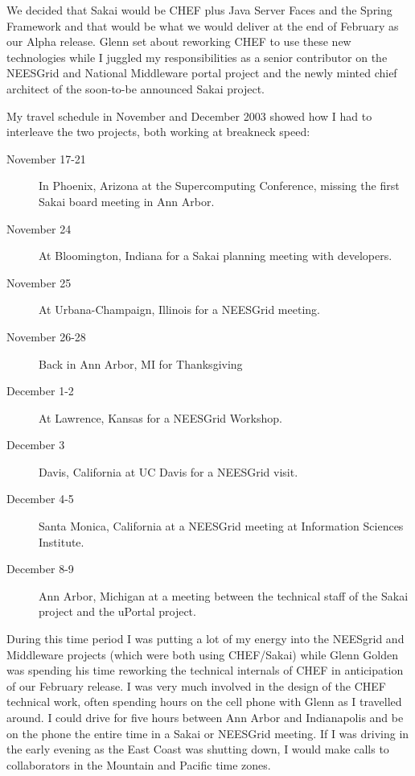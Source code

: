 \documentclass[12pt]{book}
\begin{document}
We decided that Sakai would be CHEF plus Java Server Faces and the Spring Framework
and that would be what we would deliver at the end of February as our Alpha release.
Glenn set about reworking CHEF to use these new technologies while I juggled
my responsibilities as a senior contributor on the NEESGrid and National
Middleware portal project and the newly minted chief architect of the
soon-to-be announced Sakai project.

My travel schedule in November and December 2003 showed how I had to interleave
the two projects, both working at breakneck speed:

\begin{description}

\item[November 17-21] In Phoenix, Arizona at the Supercomputing Conference,
missing the first Sakai board meeting in Ann Arbor.

\item[November 24] At Bloomington, Indiana for a Sakai planning meeting with
developers.

\item[November 25] At Urbana-Champaign, Illinois for a NEESGrid meeting.

\item[November 26-28] Back in Ann Arbor, MI for Thanksgiving

\item[December 1-2] At Lawrence, Kansas for a NEESGrid Workshop.

\item[December 3] Davis, California at UC Davis for a NEESGrid
visit.

\item[December 4-5] Santa Monica, California at a NEESGrid meeting at Information
Sciences Institute.

\item[December 8-9] Ann Arbor, Michigan at a meeting between the technical staff
of the Sakai project and the uPortal project.

\end{description}

During this time period I was putting a lot of my energy into the NEESgrid and Middleware
projects (which were both using CHEF\slash Sakai) while Glenn Golden was spending his time
reworking the technical internals of CHEF in anticipation of our February release.
I was very much involved in the design of the CHEF technical work,
often spending hours on the cell phone with Glenn as I travelled around.
I could drive for five hours between Ann Arbor and Indianapolis and be on the phone
the entire time in a Sakai or NEESGrid meeting.
If I was driving in the early evening as the East Coast was shutting down, I
would make calls to collaborators in the Mountain and Pacific time zones.
\end{document}
